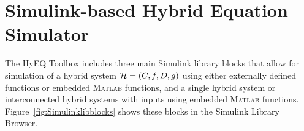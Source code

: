 \documentclass{article}
\newcommand{\matlab}{\textsc{Matlab}}
\begin{document}


\section{Simulink-based Hybrid Equation Simulator}
\label{sec:HyEQsimulator}

The HyEQ Toolbox includes three main Simulink library blocks that allow for simulation of 
a hybrid system $\mathcal{H} =(C,f,D,g)$ using either externally defined functions or embedded 
\matlab{} functions, and a single hybrid system or interconnected hybrid systems with 
inputs using embedded \matlab{} functions. Figure~\ref{fig:Simulinklibblocks} 
shows these blocks in the Simulink Library Browser.
\end{document}
